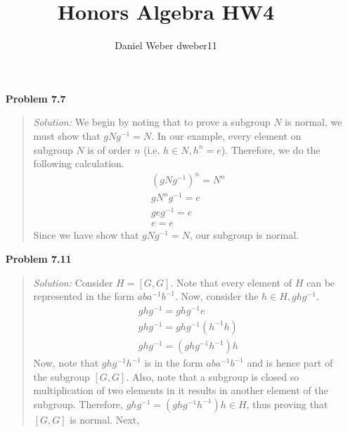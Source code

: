 \documentclass{article}
\title{Honors Algebra HW4}
\author{Daniel Weber dweber11}
\newcommand{\Solution}{\textit{Solution: }}
\begin{document}
    \maketitle
    \begin{enumerate}
        \item[\textbf{Problem 7.7}]
            \begin{quote}
                \Solution We begin by noting that to prove a subgroup $N$ is normal, we must show that $gNg^{-1} = N$. In
                our example, every element on subgroup $N$ is of order $n$ (i.e. $h \in N, h^n = e$). 
                Therefore, we do the following calculation.
                \begin{equation*}
                    \begin{gathered}
                        (gNg^{-1})^n = N^n \\
                        gN^ng^{-1} = e \\
                        geg^{-1} = e \\
                        e = e
                    \end{gathered}
                \end{equation*}
                Since we have show that $gNg^{-1} = N$, our subgroup is normal. \qedsymbol
            \end{quote} 
        \item[\textbf{Problem 7.11}]
            \begin{quote}
                \Solution Consider $H = [G, G]$. Note that every element of $H$ can be represented in the form $aba^{-1}b^{-1}$.
                Now, consider the $h \in H, ghg^{-1}$.
                \begin{equation*}
                    \begin{gathered}
                        ghg^{-1} = ghg^{-1}e \\
                        ghg^{-1} = ghg^{-1}(h^{-1}h) \\
                        ghg^{-1} = (ghg^{-1}h^{-1})h
                    \end{gathered}
                \end{equation*}
                Now, note that $ghg^{-1}h^{-1}$ is in the form $aba^{-1}b^{-1}$ and is hence part of the subgroup $[G, G]$.
                Also, note that a subgroup is closed so multiplication of two elements in it results in another element of 
                the subgroup. Therefore, $ghg^{-1} = (ghg^{-1}h^{-1})h \in H$, thus proving that $[G, G]$ is normal. Next,

\end{quote}
\end{enumerate}
\end{document}
